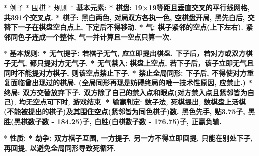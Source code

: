    
    * 例子
        * 围棋
            * 规则
                * \bf{基本元素}:
                    * \bf{棋盘}: 19×19等距且垂直交叉的平行线网格, 共391个交叉点.
                    * \bf{棋子}: 黑白两色, 对局双方各执一色, 空棋盘开局, 黑先白后, 交替下一子在棋盘空白点上, 下定后不得移动.
                    * \bf{气}: 棋子紧邻的空点(上下左右). 紧邻同色子连成一个整体, 气一并计算且一空点只算一次.
                
                * \bf{基本规则}:
                    * \bf{无气提子}: 若棋子无气, 应立即提出棋盘. 下子后，若对方或双方棋子无气, 都只提对方无气子.
                    * \bf{无气禁入}: 棋盘上空点, 若下子后，该子立即无气且同时不能提对方棋子, 则该空点禁止下子.
                    * \bf{禁止全局同形}: 下子后, 不得使对方重复面临曾出现过的棋局. (全局同形再现是妨碍终局的唯一技术性原因, 应禁止.)
                    * \bf{终局}: 双方交替放弃下子. 双方除了自己的禁入点和眼点(对方禁入点且紧邻皆为自己), 均无空点可下时, 游戏结束.
                    * \bf{输赢判定}: 数子法, 死棋提出, 数棋盘上活棋(不能被提出的棋子)及其围住空点(紧邻皆为同色棋子)数. 黑色先手, 贴3.75子, 黑胜(黑棋数子数 - 184.25)子, 白胜(白棋数子数 - 176.75)子, 正赢负输.
                    
                * \bf{性质}:
                    * \bf{劫争}: 双方棋子互围, 一方提子, 另一方不得立即回提, 只能在别处下子, 再回提, 以避免全局同形导致死循环.
